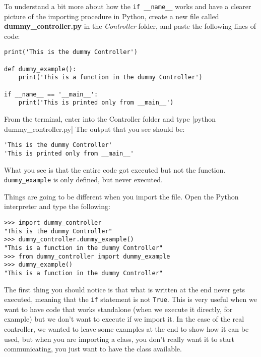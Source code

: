 To understand a bit more about how the \texttt{if __name__} works
and have a clearer picture of the importing procedure in Python, create
a new file called \textbf{dummy\_controller.py} in the \emph{Controller}
folder, and paste the following lines of code:

\begin{verbatim}
print('This is the dummy Controller')

def dummy_example():
    print('This is a function in the dummy Controller')

if __name__ == '__main__':
    print('This is printed only from __main__')
\end{verbatim}

From the terminal, enter into the Controller folder and type
|python dummy_controller.py| The output that you see
should be:

\begin{verbatim}
'This is the dummy Controller'
'This is printed only from __main__'
\end{verbatim}

What you see is that the entire code got executed but not the function.
\texttt{dummy_example} is only defined, but never executed.


Things are going to be different when you import the file. Open the
Python interpreter and type the following:

\begin{verbatim}
>>> import dummy_controller
"This is the dummy Controller"
>>> dummy_controller.dummy_example()
"This is a function in the dummy Controller"
>>> from dummy_controller import dummy_example
>>> dummy_example()
"This is a function in the dummy Controller"
\end{verbatim}

The first thing you should notice is that what is written at the end
never gets executed, meaning that the \texttt{if} statement is not
\texttt{True}. This is very useful when we want to have code that works
standalone (when we execute it directly, for example) but we don't want
to execute if we import it. In the case of the real controller, we
wanted to leave some examples at the end to show how it can be used, but
when you are importing a class, you don't really want it to start
communicating, you just want to have the class available.

